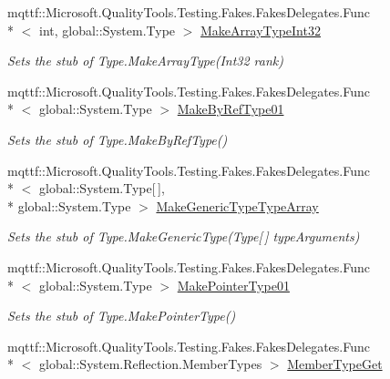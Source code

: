 \begin{DoxyCompactItemize}
mqttf\-::\-Microsoft.\-Quality\-Tools.\-Testing.\-Fakes.\-Fakes\-Delegates.\-Func\\*
$<$ int, global\-::\-System.\-Type $>$ \hyperlink{class_system_1_1_reflection_1_1_fakes_1_1_stub_type_delegator_ac13504081be1e6bb783fbb69d6107b10}{Make\-Array\-Type\-Int32}
\begin{DoxyCompactList}\small\item\em Sets the stub of Type.\-Make\-Array\-Type(\-Int32 rank)\end{DoxyCompactList}\item 
mqttf\-::\-Microsoft.\-Quality\-Tools.\-Testing.\-Fakes.\-Fakes\-Delegates.\-Func\\*
$<$ global\-::\-System.\-Type $>$ \hyperlink{class_system_1_1_reflection_1_1_fakes_1_1_stub_type_delegator_ab90debb0c2b7be021a05bd7c41539ea5}{Make\-By\-Ref\-Type01}
\begin{DoxyCompactList}\small\item\em Sets the stub of Type.\-Make\-By\-Ref\-Type()\end{DoxyCompactList}\item 
mqttf\-::\-Microsoft.\-Quality\-Tools.\-Testing.\-Fakes.\-Fakes\-Delegates.\-Func\\*
$<$ global\-::\-System.\-Type\mbox{[}$\,$\mbox{]}, \\*
global\-::\-System.\-Type $>$ \hyperlink{class_system_1_1_reflection_1_1_fakes_1_1_stub_type_delegator_adc8d29f4e8c073be9bdfd4987862f20c}{Make\-Generic\-Type\-Type\-Array}
\begin{DoxyCompactList}\small\item\em Sets the stub of Type.\-Make\-Generic\-Type(\-Type\mbox{[}$\,$\mbox{]} type\-Arguments)\end{DoxyCompactList}\item 
mqttf\-::\-Microsoft.\-Quality\-Tools.\-Testing.\-Fakes.\-Fakes\-Delegates.\-Func\\*
$<$ global\-::\-System.\-Type $>$ \hyperlink{class_system_1_1_reflection_1_1_fakes_1_1_stub_type_delegator_a78cf6a03bacc7f7765364835b3111499}{Make\-Pointer\-Type01}
\begin{DoxyCompactList}\small\item\em Sets the stub of Type.\-Make\-Pointer\-Type()\end{DoxyCompactList}\item 
mqttf\-::\-Microsoft.\-Quality\-Tools.\-Testing.\-Fakes.\-Fakes\-Delegates.\-Func\\*
$<$ global\-::\-System.\-Reflection.\-Member\-Types $>$ \hyperlink{class_system_1_1_reflection_1_1_fakes_1_1_stub_type_delegator_a7b0e57ef3800040c4ba69b768a48a92b}{Member\-Type\-Get}

\end{DoxyCompactItemize}
